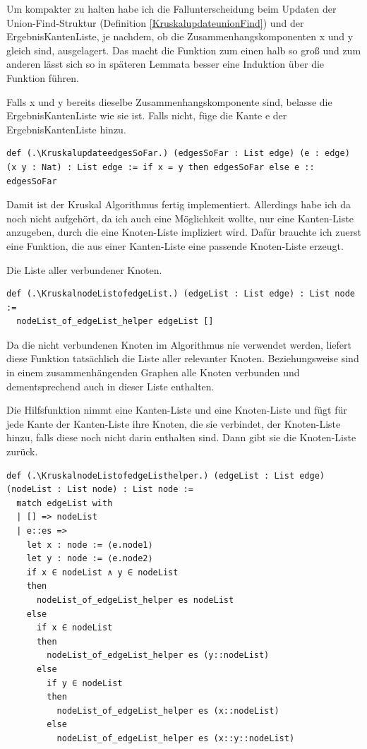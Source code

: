 Um \Kruskalkruskalhelper kompakter zu halten habe ich die Fallunterscheidung beim Updaten der Union-Find-Struktur
(Definition \ref{KruskalupdateunionFind}) und der ErgebnisKantenListe,
je nachdem, ob die Zusammenhangskomponenten x und y gleich sind, ausgelagert.
Das macht die Funktion zum einen halb so groß und zum anderen lässt sich so in späteren Lemmata besser eine Induktion über die Funktion führen.

\begin{definition}[\KruskalupdateedgesSoFar]
  Falls x und y bereits dieselbe Zusammenhangskomponente sind, belasse die ErgebnisKantenListe wie sie ist.
  Falls nicht, füge die Kante e der ErgebnisKantenListe hinzu.
\end{definition}
\begin{lstlisting}
def (.\KruskalupdateedgesSoFar.) (edgesSoFar : List edge) (e : edge) (x y : Nat) : List edge := if x = y then edgesSoFar else e :: edgesSoFar
\end{lstlisting}

Damit ist der Kruskal Algorithmus fertig implementiert.
Allerdings habe ich da noch nicht aufgehört, da ich auch eine Möglichkeit wollte, nur eine Kanten-Liste anzugeben, durch die eine Knoten-Liste impliziert wird.
Dafür brauchte ich zuerst eine Funktion, die aus einer Kanten-Liste eine passende Knoten-Liste erzeugt.

\begin{definition}[\KruskalnodeListofedgeList]
  Die Liste aller verbundener Knoten.
\end{definition}
\begin{lstlisting}
def (.\KruskalnodeListofedgeList.) (edgeList : List edge) : List node :=
  nodeList_of_edgeList_helper edgeList []
\end{lstlisting}

Da die nicht verbundenen Knoten im Algorithmus nie verwendet werden, liefert diese Funktion tatsächlich die Liste aller relevanter Knoten.
Beziehungsweise sind in einem zusammenhängenden Graphen alle Knoten verbunden und dementsprechend auch in dieser Liste enthalten.

\begin{definition}[\KruskalnodeListofedgeListhelper]
  Die Hilfsfunktion nimmt eine Kanten-Liste und eine Knoten-Liste und fügt
  für jede Kante der Kanten-Liste ihre Knoten, die sie verbindet, der Knoten-Liste hinzu, falls diese noch nicht darin enthalten sind.
  Dann gibt sie die Knoten-Liste zurück.
\end{definition}
\begin{lstlisting}
def (.\KruskalnodeListofedgeListhelper.) (edgeList : List edge) (nodeList : List node) : List node :=
  match edgeList with
  | [] => nodeList
  | e::es =>
    let x : node := ⟨e.node1⟩
    let y : node := ⟨e.node2⟩
    if x ∈ nodeList ∧ y ∈ nodeList
    then
      nodeList_of_edgeList_helper es nodeList
    else
      if x ∈ nodeList
      then
        nodeList_of_edgeList_helper es (y::nodeList)
      else
        if y ∈ nodeList
        then
          nodeList_of_edgeList_helper es (x::nodeList)
        else
          nodeList_of_edgeList_helper es (x::y::nodeList)
\end{lstlisting}

